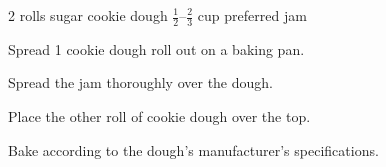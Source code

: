 \dishtype{\dessert}
\dishother{\vegetarian}
\begin{ingreds}
    2 rolls sugar cookie dough
    $\frac{1}{2}$--$\frac{2}{3}$ cup preferred jam
\end{ingreds}
\begin{method}
    Spread 1 cookie dough roll out on a baking pan.\par
    Spread the jam thoroughly over the dough.\par
    Place the other roll of cookie dough over the top.\par
    Bake according to the dough's manufacturer's specifications.
\end{method}